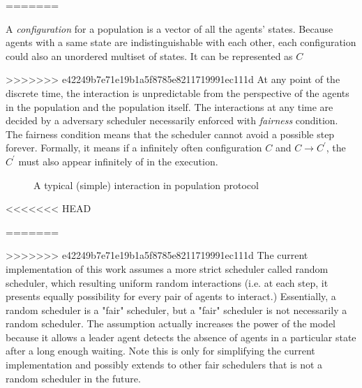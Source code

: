 \par \label{IntroToPPFairScheduler} \noindent
=======
\par
A \textit{configuration} for a population is a vector of all the agents' states.
Because agents with a same state are indistinguishable with each other, each configuration
could also an unordered multiset of states. It can be represented as $C$
\par
\label{IntroToPPFairScheduler}
>>>>>>> e42249b7e71e19b1a5f8785e8211719991ec111d
At any point of the discrete time, the interaction is unpredictable from the perspective of the agents
in the population and the population itself. The interactions at any time are decided
by a adversary scheduler necessarily enforced with \textit{fairness} condition.
The fairness condition means that the scheduler cannot avoid a possible step forever.
Formally, it means if a infinitely often configuration $C$ and $C \to C^{'}$,
the $C^{'}$ must also appear infinitely of in the execution.


\begin{figure}[H]
\begin{center}
\end{center}
\caption{A typical (simple) interaction in population protocol}
\end{figure}


<<<<<<< HEAD
\par\noindent
=======
\par
>>>>>>> e42249b7e71e19b1a5f8785e8211719991ec111d
The current implementation of this work assumes a more strict scheduler called random scheduler,
which resulting uniform random interactions (i.e. at each step, it presents
equally possibility for every pair of agents to interact.) Essentially, a random scheduler is a "fair" scheduler, but a "fair" scheduler is not necessarily a random scheduler.
The assumption actually increases the power of the model because it allows a leader agent detects the absence
of agents in a particular state after a long enough waiting. Note this is only for
simplifying the current implementation and possibly extends to other fair schedulers that is not a
random scheduler in the future.

